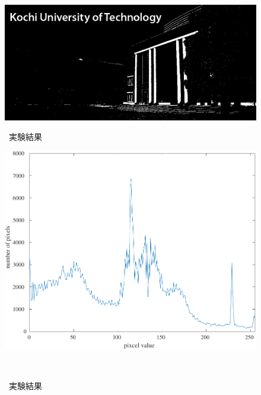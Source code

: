 \begin{figure}[H]
\begin{minipage}[b]{.7\textwidth}
\begin{minipage}[b]{.3\textwidth}
        \end{minipage}
        \begin{minipage}[b]{.3\textwidth}
            \centering
            \includegraphics[keepaspectratio,width=\textwidth]{../../Figures/05_43.png}
        \end{minipage}
        \caption{\kadaiad\ 実験結果}
    \end{minipage}
    \begin{minipage}[b]{.25\textwidth}
        \centering
        \includegraphics[keepaspectratio,width=\textwidth]{../../Figures/05_50_graph.pdf}
        \caption{\kadaiae\ 実験結果}
    \end{minipage}
    \nextfloat
    \\\vsp
    \begin{minipage}[b]{.49\textwidth}
        \centering
        \begin{minipage}[b]{.3\textwidth}
            \centering

\end{minipage}
\end{minipage}
\end{figure}
